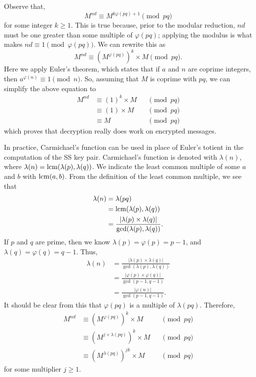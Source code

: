 Observe that,
\[
  M^{n d} \equiv M^{k \varphi(pq) + 1} \pmod{pq}
\]
for some integer $k \ge 1$. This is true because, prior to the
modular reduction, $nd$ must be one greater than some multiple of
$\varphi(pq)$; applying the modulus is what makes
$n d \equiv 1 \pmod{\varphi(pq)}$. We can rewrite this as
\[
  M^{n d} \equiv (M^{\varphi(pq)})^k \times M \pmod{pq}.
\]
Here we apply Euler's theorem, which states that if $a$ and $n$ are
coprime integers, then $a^{\varphi(n)} \equiv 1 \pmod{n}$. So, assuming
that $M$ is coprime with $pq$, we can simplify the above equation to
\begin{align*}
  M^{n d} &\equiv (1)^k \times M  &&\pmod{pq} \\
          &\equiv (1) \times M  &&\pmod{pq} \\
          &\equiv M  &&\pmod{pq}
\end{align*}
which proves that decryption really does work on encrypted messages.

In practice, Carmichael's function can be used in place of Euler's totient in
the computation of the SS key pair. Carmichael's function is denoted with
$\lambda(n)$, where $\lambda(n) = \operatorname{lcm}(\lambda(p), \lambda(q))$.
We indicate the least common multiple of some $a$ and $b$ with
$\operatorname{lcm}(a, b)$. From the definition of the least common multiple, we
see that
\begin{align*}
  \lambda(n) &= \lambda(pq) \\
             &= \operatorname{lcm}(\lambda(p), \lambda(q)) \\
             &= \frac{|\lambda(p) \times \lambda(q)|}{\gcd(\lambda(p), \lambda(q))}.
\end{align*}
If $p$ and $q$ are prime, then we know
$\lambda(p) = \varphi(p) = p - 1$, and $\lambda(q) = \varphi(q) = q - 1$. Thus,
\begin{align*}
  \lambda(n) &= \frac{|\lambda(p) \times \lambda(q)|}{\gcd(\lambda(p), \lambda(q))} \\
             &= \frac{|\varphi(p) \times \varphi(q)|}{\gcd(p - 1, q - 1)} \\
             &= \frac{|\varphi(n)|}{\gcd(p - 1, q - 1)}.
\end{align*}
It should be clear from this that $\varphi(pq)$ is a multiple of $\lambda(pq)$.
Therefore,
\begin{align*}
  M^{n d} &\equiv (M^{\varphi(pq)})^k \times M &&\pmod{pq} \\
          &\equiv (M^{j \times \lambda(pq)})^k \times M &&\pmod{pq} \\
          &\equiv (M^{\lambda(pq)})^{jk} \times M &&\pmod{pq}
\end{align*}
for some multiplier $j \ge 1$.

